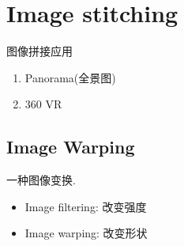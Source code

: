 \chapter{Image stitching}
图像拼接应用
\begin{enumerate}
    \item Panorama(全景图)
    \item 360 VR
\end{enumerate}
\section{Image Warping}
一种图像变换. 
\begin{itemize}
    \item Image filtering: 改变强度
    \item Image warping: 改变形状
\end{itemize}
